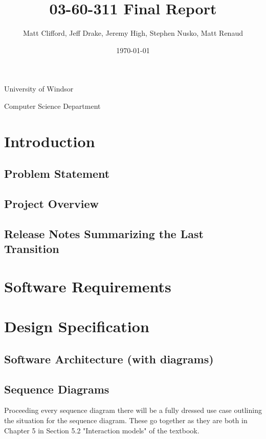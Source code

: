 \documentclass[11pt]{article}
\title{03-60-311 Final Report}
\author{Matt Clifford, Jeff Drake, Jeremy High, Stephen Nusko, Matt Renaud}
\date{\today}
\begin{document}
\maketitle

\vspace{1in}

\begin{center}
  University of Windsor

  Computer Science Department
\end{center}

\newpage
\setcounter{tocdepth}{3}
\tableofcontents
\vspace*{1cm}

\section{Introduction}

\subsection{Problem Statement}

\subsection{Project Overview}

\subsection{Release Notes Summarizing the Last Transition}

\section{Software Requirements}

\section{Design Specification}

\subsection{Software Architecture (with diagrams)}

\subsection{Sequence Diagrams }
	Proceeding every sequence diagram there will be a fully dressed use case outlining the situation for the sequence diagram. 
	These go together as they are both in Chapter 5 in Section 5.2 "Interaction models" of the textbook.
\end{document}
